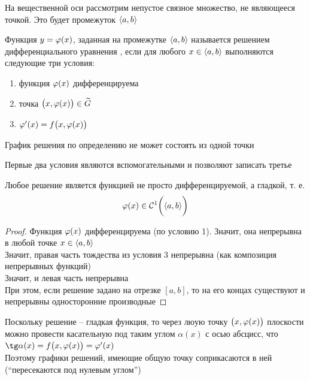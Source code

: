 На вещественной оси рассмотрим непустое связное множество, не являющееся точкой. Это будет промежуток $ \braket{a, b} $

\begin{definition}
    Функция $ y = \vphi(x) $, заданная на промежутке $ \braket{a, b} $ называется решением дифференциального уравнения , если для любого $ x \in \braket{a, b} $ выполняются следующие три условия:
    \begin{enumerate}
        \item функция $ \vphi(x) $ дифференцируема
        \item точка $ \big( x, \vphi(x) \big) \in \vawe{G} $
        \item $ \vphi'(x) = f\big( x, \vphi(x) \big) $
    \end{enumerate}
\end{definition}

\begin{remark}
	График решения по определению не может состоять из одной точки
\end{remark}

\begin{remark}
	Первые два условия являются вспомогательными и позволяют записать третье
\end{remark}

\begin{remark}
    Любое решение является функцией не просто дифференцируемой, а гладкой, т. е.
    $$ \vphi(x) \in \Cont[1]{\braket{a, b}} $$
\end{remark}

\begin{proof}
    Функция $ \vphi(x) $ дифференцируема (по условию 1). Значит, она непрерывна в любой точке $ x \in \braket{a, b} $ \\
    Значит, правая часть тождества из условия 3 непрерывна (как композиция непрерывных функций) \\
    Значит, и левая часть непрерывна \\
    При этом, если решение задано на отрезке $ [a, b] $, то на его концах существуют и непрерывны односторонние производные
\end{proof}

\begin{definition}
	Поскольку решение -- гладкая функция, то через люую точку $ \big( x, \vphi(x) \big) $ плоскости можно провести касательную под таким углом $ \alpha(x) $ с осью абсцисс, что $ \tg \alpha(x) = f \big(x, \vphi(x) \big) = \vphi'(x) $ \\
    Поэтому графики решений, имеющие общую точку соприкасаются в ней (``пересекаются под нулевым углом'')
\end{definition}

